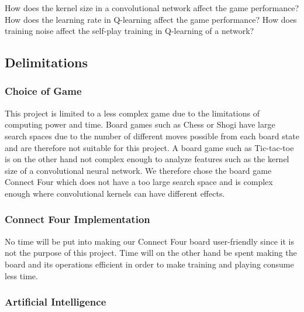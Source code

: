 \documentclass[titlepage]{article}
\begin{document}
\vskip 0.6cm

\begin{outline}
    \1 How does the kernel size in a convolutional network affect the game performance? 
    \1 How does the learning rate in Q-learning affect the game performance? 
    \1 How does training noise affect the self-play training in Q-learning of a network?
\end{outline}

\newpage

\subsection{Delimitations}

\vskip 0.2cm

\subsubsection{Choice of Game}

\vskip 0.2cm

This project is limited to a less complex game due to the limitations of computing power and time. Board games such as Chess or Shogi have large search spaces due to the number of different moves possible from each board state and are therefore not suitable for this project. A board game such as Tic-tac-toe is on the other hand not complex enough to analyze features such as the kernel size of a convolutional neural network. We therefore chose the board game Connect Four which does not have a too large search space and is complex enough where convolutional kernels can have different effects. 

\subsubsection{Connect Four Implementation}

\vskip 0.2cm

No time will be put into making our Connect Four board user-friendly since it is not the purpose of this project. Time will on the other hand be spent making the board and its operations efficient in order to make training and playing consume less time. 

\subsubsection{Artificial Intelligence}

\vskip 0.2cm
\end{document}
